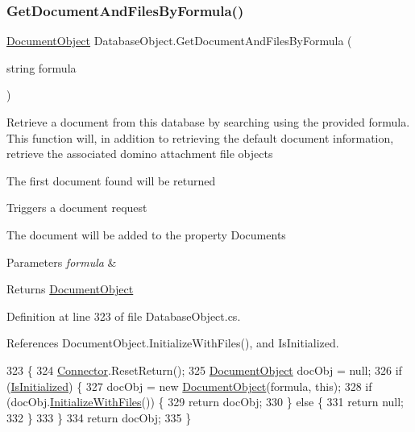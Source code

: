 \subsubsection{\texorpdfstring{Get\+Document\+And\+Files\+By\+Formula()}{GetDocumentAndFilesByFormula()}}
{\footnotesize\ttfamily \mbox{\hyperlink{class_document_object}{Document\+Object}} Database\+Object.\+Get\+Document\+And\+Files\+By\+Formula (\begin{DoxyParamCaption}\item[{string}]{formula }\end{DoxyParamCaption})}



Retrieve a document from this database by searching using the provided formula. This function will, in addition to retrieving the default document information, retrieve the associated domino attachment file objects 

The first document found will be returned

Triggers a document request

The document will be added to the property \textquotesingle{}Documents\textquotesingle{}


\begin{DoxyParams}{Parameters}
{\em formula} & \\
\hline
\end{DoxyParams}
\begin{DoxyReturn}{Returns}
\mbox{\hyperlink{class_document_object}{Document\+Object}}
\end{DoxyReturn}


Definition at line 323 of file Database\+Object.\+cs.



References Document\+Object.\+Initialize\+With\+Files(), and Is\+Initialized.


\begin{DoxyCode}
323                                                                        \{
324         \mbox{\hyperlink{class_connector}{Connector}}.ResetReturn();
325         \mbox{\hyperlink{class_document_object}{DocumentObject}} docObj = null;
326         \textcolor{keywordflow}{if} (\mbox{\hyperlink{class_database_object_a5fe036d32a30eb10d1b3f6a30263f740}{IsInitialized}}) \{
327             docObj = \textcolor{keyword}{new} \mbox{\hyperlink{class_document_object}{DocumentObject}}(formula, \textcolor{keyword}{this});
328             \textcolor{keywordflow}{if} (docObj.\mbox{\hyperlink{class_document_object_a83f0e855adc5fb7afd02d2e34767f5c8}{InitializeWithFiles}}()) \{
329                 \textcolor{keywordflow}{return} docObj;
330             \} \textcolor{keywordflow}{else} \{
331                 \textcolor{keywordflow}{return} null;
332             \}
333         \}
334         \textcolor{keywordflow}{return} docObj;
335     \}
\end{DoxyCode}
\mbox{\label{class_database_object_a30968034c65328e44ddb0fdac8ab1435}} 
